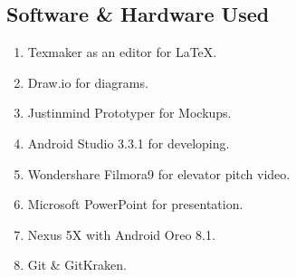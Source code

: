 \subsection{Software \& Hardware Used}
\begin{enumerate}
\item Texmaker as an editor for \LaTeX.
\item Draw.io for diagrams.
\item Justinmind Prototyper for Mockups.
\item Android Studio 3.3.1 for developing.
\item Wondershare Filmora9 for elevator pitch video.
\item Microsoft PowerPoint for presentation.
\item Nexus 5X with Android Oreo 8.1.
\item Git \& GitKraken.
\end{enumerate}